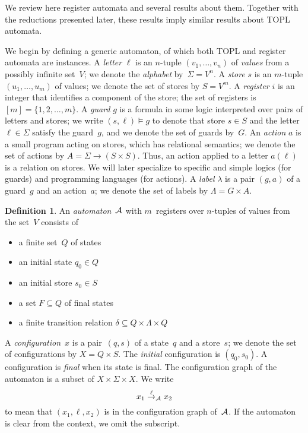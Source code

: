 \documentclass[9pt, preprint]{sigplanconf} %
\theoremstyle{definition}
\newtheorem{definition}{Definition}
\theoremstyle{remark}
\begin{document}
We review here register automata and several results about them.
Together with the reductions presented later, these results imply similar results about TOPL automata.

We begin by defining a generic automaton, of which both TOPL and register automata are instances.
A \emph{letter} $\ell$ is an $n$-tuple $(v_1,\ldots,v_n)$ of \emph{values} from a possibly infinite set~$V$;
we denote the \emph{alphabet} by~$\Sigma=V^n$.
A \emph{store} $s$ is an $m$-tuple $(u_1,\ldots,u_m)$ of values;
we denote the set of stores by $S=V^m$.
A \emph{register} $i$ is an integer that identifies a component of the store;
the set of registers is $[m]=\{1,2,\ldots,m\}$.
A \emph{guard} $g$ is a formula in some logic interpreted over pairs of letters and stores;
we write $(s,\ell)\models g$ to denote that store $s\in S$ and the letter $\ell\in\Sigma$ satisfy the guard~$g$, and we denote the set of guards by~$G$.
An \emph{action} $a$ is a small program acting on stores, which has relational semantics;
we denote the set of actions by $A=\Sigma\to(S\times S)$.
Thus, an action applied to a letter $a(\ell)$ is a relation on stores.
We will later specialize to specific and simple logics (for guards) and programming languages (for actions).
A \emph{label} $\lambda$ is a pair $(g,a)$ of a guard~$g$ and an action~$a$;
we denote the set of labels by $\Lambda=G\times A$.

\begin{definition}\label{def:automaton}
An \emph{automaton}~${\cal A}$ with $m$~registers over $n$-tuples of values from the set~$V$ consists of
\begin{itemize}
\item a finite set~$Q$ of states
\item an initial state $q_0\in Q$
\item an initial store $s_0\in S$
\item a set $F\subseteq Q$ of final states
\item a finite transition relation $\delta\subseteq Q\times\Lambda\times Q$
\end{itemize}
\end{definition}

A \emph{configuration}~$x$ is a pair~$(q,s)$ of a state~$q$ and a store~$s$;
we denote the set of configurations by $X=Q\times S$.
The \emph{initial} configuration is $(q_0,s_0)$.
A configuration is \emph{final} when its state is final.
The configuration graph of the automaton is a subset of $X\times\Sigma\times X$.
We write \[x_1\stackrel{\ell}{\to}_{\cal A}x_2\] to mean that $(x_1,\ell,x_2)$ is in the configuration graph of~${\cal A}$.
If the automaton is clear from the context, we omit the subscript.
\end{document}
